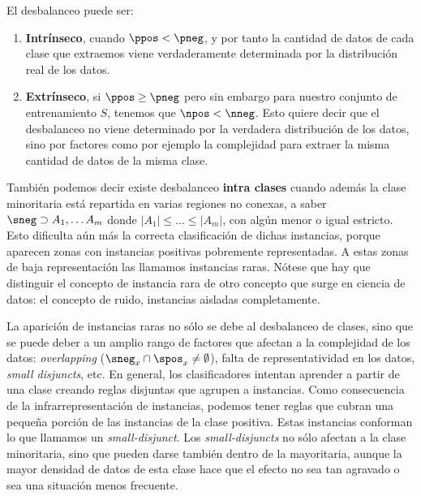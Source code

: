 El desbalanceo puede ser:

\begin{enumerate}[i]
  \item \textbf{Intrínseco}, cuando $\ppos < \pneg$, y por tanto la cantidad de datos de cada clase que extraemos viene 
  verdaderamente determinada por la distribución real de los datos.

  \item \textbf{Extrínseco}, si $\ppos \ge \pneg$ pero sin embargo para nuestro conjunto de entrenamiento $S$, 
  tenemos que $\npos < \nneg$. Esto quiere decir que el desbalanceo no viene determinado por la verdadera distribución de
  los datos, sino por factores como por ejemplo la complejidad para extraer la misma cantidad de datos de la misma clase.
\end{enumerate}

También podemos decir existe desbalanceo \textbf{intra clases} cuando además la clase minoritaria está repartida en varias 
regiones no conexas, a saber $\sneg \supset A_1, \ldots A_m$ donde $|A_1| \le \ldots \le |A_m|$, con algún menor o igual estricto.
Esto dificulta aún más la correcta clasificación de dichas instancias, porque aparecen zonas con instancias positivas 
pobremente representadas. A estas zonas de baja representación las llamamos instancias raras. Nótese que hay que distinguir
el concepto de instancia rara de otro concepto que surge en ciencia de datos: el concepto de ruido, instancias aisladas completamente.
   
La aparición de instancias raras no sólo se debe al desbalanceo de clases, sino que se puede deber a un amplio rango de factores 
que afectan a la complejidad de los datos: \textit{overlapping} ($\sneg_x \cap \spos_x \neq \emptyset$), falta de 
representatividad en los datos, \textit{small disjuncts}, etc. En general, los clasificadores intentan aprender a partir de una clase 
creando reglas disjuntas que agrupen a instancias. Como consecuencia de la infrarrepresentación de instancias, podemos tener
reglas que cubran una pequeña porción de las instancias de la clase positiva. Estas instancias conforman lo que llamamos 
un \textit{small-disjunct}. Los \textit{small-disjuncts} no sólo afectan a la clase minoritaria, sino que pueden darse también 
dentro de la mayoritaria, aunque la mayor densidad de datos de esta clase hace que el efecto no sea tan agravado o 
sea una situación menos frecuente. 


